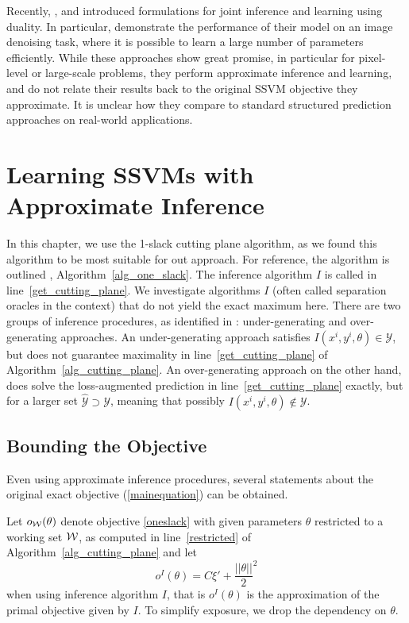 Recently, \citet{meshi2010learning}, \citet{hazan2010primal} and
\citet{komodakis2011efficient} introduced formulations for joint inference and
learning using duality.
In particular, \citet{hazan2010primal} demonstrate the performance of their
model on an image denoising task, where it is possible to learn a large number
of parameters efficiently.
While these approaches show great promise, in particular for pixel-level or
large-scale problems, they perform approximate inference and learning, and do
not relate their results back to the original SSVM objective they approximate.
It is unclear how they compare to standard structured prediction approaches
on real-world applications.


\section{Learning SSVMs with Approximate Inference}
In this chapter, we use the 1-slack cutting plane algorithm, as we found this
algorithm to be most suitable for out approach. For reference, the algorithm is outlined
, Algorithm~\ref{alg_one_slack}. The inference algorithm $I$ is called
in line~\ref{get_cutting_plane}. We investigate algorithms $I$ (often called separation
oracles in the context) that do not yield the exact maximum here.
There are two groups of inference procedures, as identified in
\citet{finley2008training}: under-generating and over-generating approaches.
An under-generating approach satisfies $I(x^i, y^i, \theta) \in
\mathcal{Y}$, but does not guarantee maximality in line~\ref{get_cutting_plane}
of Algorithm~\ref{alg_cutting_plane}. An over-generating approach on the other
hand, does solve the loss-augmented prediction in line~\ref{get_cutting_plane}
exactly, but for a larger set $\hat{\mathcal{Y}} \supset \mathcal{Y}$, meaning
that possibly $I(x^i, y^i, \theta) \notin \mathcal{Y}$.

\subsection{Bounding the Objective}
Even using approximate inference procedures, several statements
about the original exact objective (\eqref{mainequation}) can be
obtained.

Let $o_{\mathcal{W}}(\theta)$ denote objective \eqref{oneslack} with
given parameters $\theta$ restricted to a working set $\mathcal{W}$, as computed in
line~\ref{restricted} of Algorithm~\ref{alg_cutting_plane} and  let
\[
    o^I(\theta) = C\xi' + \frac{||\theta||}{2}^2
\]
when using inference algorithm $I$, that is $o^I(\theta)$ is the approximation of the primal
objective given by $I$. To simplify exposure, we drop the dependency on $\theta$.

